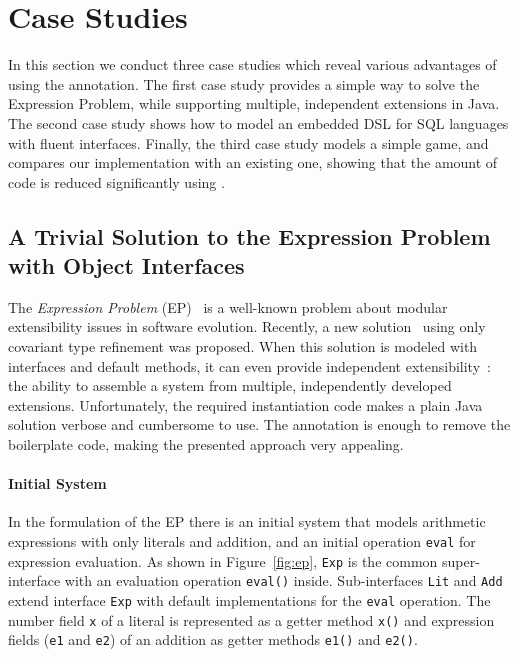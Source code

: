 \section{Case Studies}
In this section we conduct three case studies which reveal various
advantages of using the \mixin annotation. The first case study provides a
simple way to solve the Expression Problem, while supporting multiple,
independent extensions in Java.  The second case study shows how to model an
embedded DSL for SQL languages with fluent interfaces. Finally, the third 
case study models a simple game, and compares our implementation with an 
existing one, showing that the amount of code is reduced significantly using \mixin.

\subsection{A Trivial Solution to the Expression Problem with Object Interfaces}

The \emph{Expression Problem} (EP)~\cite{wadler98expression} is a well-known
problem about modular extensibility issues in software evolution. Recently, a
new solution~\cite{eptrivially} using only covariant type refinement was
proposed. When this solution is modeled with interfaces and default methods, it
can even provide independent extensibility~\cite{zenger05independentlyextensible}: the ability to assemble a system
from multiple, independently developed extensions. Unfortunately, the
required instantiation code makes a plain Java solution verbose and cumbersome
to use. The \mixin annotation is enough to remove the boilerplate code, making
the presented approach very appealing.

\paragraph{Initial System}
In the formulation of the EP there is an initial system that models
arithmetic expressions with only literals and addition, and an initial 
operation \texttt{eval} for expression evaluation.
As shown in Figure~\ref{fig:ep}, \texttt{Exp} is the common
super-interface with an evaluation operation \texttt{eval()}
inside. Sub-interfaces \texttt{Lit} and \texttt{Add} extend interface
\texttt{Exp} with default implementations for the \texttt{eval} operation. The
number field \texttt{x} of a literal is represented as a getter method
\texttt{x()} and expression fields (\texttt{e1} and \texttt{e2}) of an addition
as getter methods \texttt{e1()} and \texttt{e2()}.

